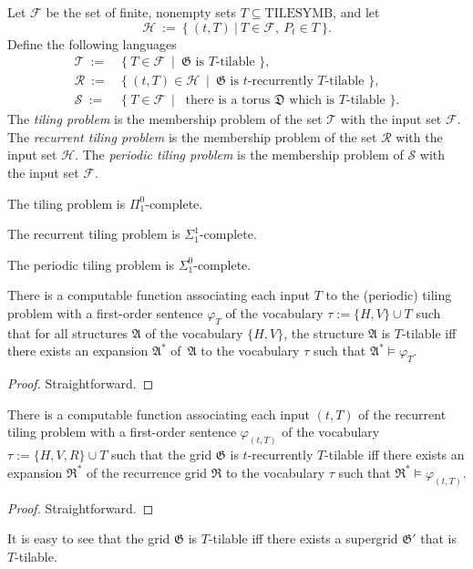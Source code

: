 \documentclass{LMCS}
\theoremstyle{plain}
\newcommand{\mf}{\mathfrak}
\begin{document}
%
Let $\mathcal{F}$ be the set of finite, nonempty sets $T\subseteq\mathrm{TILESYMB}$, and let
%
%
%
$$\mathcal{H}\ :=\ \{\ (t,T)\ |\ T\in\mathcal{F},\ P_t\in T\ \}.$$
%
%
%
Define the following languages
\begin{align*}
\mathcal{T}\ :=&\ \{\ T\in\mathcal{F}\ \mid\ \mf{G}\text{ is $T$-tilable } \},\\
\mathcal{R}\ :=&\ \{\ (t,T)\in\mathcal{H}\ \mid\ \mf{G}\text{ is $t$-recurrently $T$-tilable } \},\\
\mathcal{S}\ :=&\ \{\ T\in \mathcal{F}\ \mid\
%
\text{ there is a torus $\mf{D}$ which is $T$-tilable }\}.
\end{align*}
%
The \emph{tiling problem} is the membership problem of the set $\mathcal{T}$
%
with the input set $\mathcal{F}$.
%
The \emph{recurrent tiling problem} is the
%
membership problem of the set $\mathcal{R}$
%
with the input set $\mathcal{H}$.
%
The
%
\emph{periodic tiling problem} is the
%
membership problem of $\mathcal{S}$ with the input set $\mathcal{F}$.



%
\begin{thm}\cite{Berger}
%
The tiling problem is $\Pi_1^0$-complete.
%
\end{thm}
%
\begin{thm}\cite{Harel:1985}
%
The recurrent tiling problem is $\Sigma_1^1$-complete.
%
\end{thm}


\begin{thm}\cite{GurevichKoryakov:1972}\label{periodictilingcomplete}
%
The periodic tiling problem is $\Sigma^0_1$-complete.
%
\end{thm}

%
%
%
%
\begin{lem}\label{tilingdefinablelemma}
%
There is a computable function associating
%
each input $T$ to the
%
(periodic) tiling problem with a first-order sentence $\varphi_{T}$ of the
%
vocabulary $\tau:=\{H,V\}\cup T$ 
%
such that for all structures $\mf{A}$ of the vocabulary $\{H,V\}$, the structure $\mf{A}$ is $T$-tilable iff
%
there exists an expansion $\mf{A}^*$ of\, $\mf{A}$ to the
%
vocabulary $\tau$ such that $\mf{A}^*\models\varphi_{T}$.
%
\end{lem} 
%
%
%
\begin{proof}
%
Straightforward.
%
\end{proof}
%
\begin{lem}\label{recurrencetilingdefinablelemma}
%
There is a computable function associating
%
each input $(t,T)$ of the
%
recurrent tiling problem with a first-order sentence $\varphi_{(t,T)}$ of the
%
vocabulary $\tau:=\{H,V,R\}\cup T$ 
%
such that the grid $\mf{G}$ is $t$-recurrently $T$-tilable iff
%
there exists an expansion $\mf{R}^*$ of the recurrence grid $\mf{R}$ to the
%
vocabulary $\tau$ such that $\mf{R}^*\models\varphi_{(t,T)}$.
%
\end{lem} 
%
\begin{proof}
%
Straightforward.
%
\end{proof}
%
It is easy to see that the grid $\mf{G}$ is $T$-tilable iff there exists a supergrid $\mf{G'}$ that is $T$-tilable.%
\end{document}
